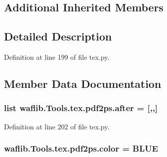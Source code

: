 \subsection*{Additional Inherited Members}


\subsection{Detailed Description}


Definition at line 199 of file tex.\+py.



\subsection{Member Data Documentation}
\subsubsection[{\texorpdfstring{after}{after}}]{\setlength{\rightskip}{0pt plus 5cm}list waflib.\+Tools.\+tex.\+pdf2ps.\+after = \mbox{[}\textquotesingle{},\textquotesingle{},\textquotesingle{}\mbox{]}\hspace{0.3cm}{\ttfamily [static]}}\hypertarget{classwaflib_1_1_tools_1_1tex_1_1pdf2ps_a106685110317a2fd683231d19dbfa09e}{}\label{classwaflib_1_1_tools_1_1tex_1_1pdf2ps_a106685110317a2fd683231d19dbfa09e}


Definition at line 202 of file tex.\+py.

\subsubsection[{\texorpdfstring{color}{color}}]{ waflib.\+Tools.\+tex.\+pdf2ps.\+color = \textquotesingle{}B\+L\+UE\textquotesingle{}\hspace{0.3cm}{\ttfamily [static]}}\hypertarget{classwaflib_1_1_tools_1_1tex_1_1pdf2ps_a602d2f88324a231dbd7b7513771fbd48}{}\label{classwaflib_1_1_tools_1_1tex_1_1pdf2ps_a602d2f88324a231dbd7b7513771fbd48}


